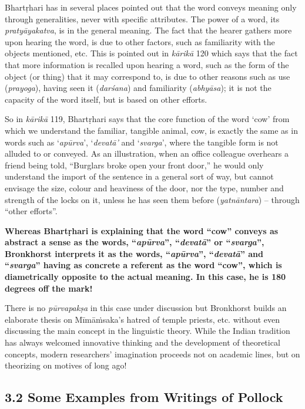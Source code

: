 Bhartṛhari has in several places pointed out that the word conveys meaning only through generalities, never with specific attributes. The power of a word, its \textit{pratyāyakatva}, is in the general meaning. The fact that the hearer gathers more upon hearing the word, is due to other factors, such as familiarity with the objects mentioned, etc. This is pointed out in \textit{kārikā} 120 which says that the fact that more information is recalled upon hearing a word, such as the form of the object (or thing) that it may correspond to, is due to other reasons such as use (\textit{prayoga}), having seen it (\textit{darśana}) and familiarity (\textit{abhyāsa}); it is not the capacity of the word itself, but is based on other efforts.

So in \textit{kārikā} 119, Bhartṛhari says that the core function of the word ‘cow’ from which we understand the familiar, tangible animal, cow, is exactly the same as in words such as ‘\textit{apūrva}’, ‘\textit{devatā’} and ‘\textit{svarga}’, where the tangible form is not alluded to or conveyed. As an illustration, when an office colleague overhears a friend being told, “Burglars broke open your front door,” he would only understand the import of the sentence in a general sort of way, but cannot envisage the size, colour and heaviness of the door, nor the type, number and strength of the locks on it, unless he has seen them before (\textit{yatnāntara}) – through “other efforts”.

\textbf{Whereas Bhartṛhari is explaining that the word “cow” conveys as abstract a sense as the words, “\textit{apūrva}”, “\textit{devatā}” or “\textit{svarga}”, Bronkhorst interprets it as the words, “\textit{apūrva}”, “\textit{devatā}” and “\textit{svarga}” having as concrete a referent as the word “cow”, which is diametrically opposite to the actual meaning. In this case, he is 180 degrees off the mark!}

There is no \textit{pūrvapakṣa} in this case under discussion but Bronkhorst builds an elaborate thesis on Mīmāṁsaka’s hatred of temple priests, etc. without even discussing the main concept in the linguistic theory. While the Indian tradition has always welcomed innovative thinking and the development of theoretical concepts, modern researchers’ imagination proceeds not on academic lines, but on theorizing on motives of long ago!

\vspace{-.3cm}

\subsection*{3.2 Some Examples from Writings of Pollock}

